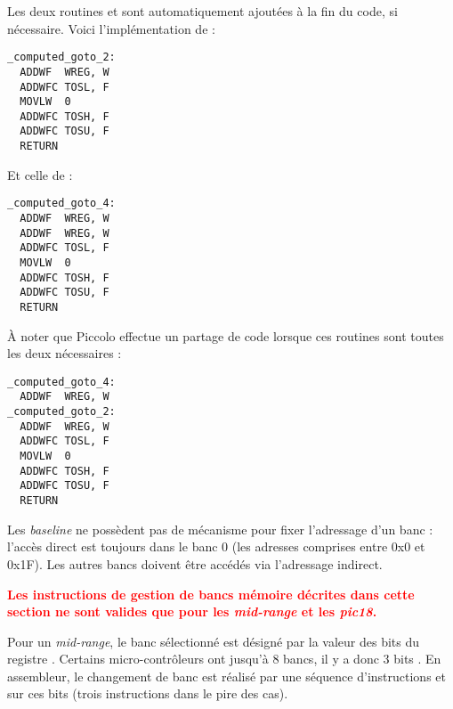 
Les deux routines  et  sont automatiquement ajoutées à la fin du code, si nécessaire. Voici l'implémentation de  :
\begin{lstlisting}[language=assembleur]
_computed_goto_2:
  ADDWF  WREG, W
  ADDWFC TOSL, F
  MOVLW  0
  ADDWFC TOSH, F
  ADDWFC TOSU, F
  RETURN
\end{lstlisting}

Et celle de  :
\begin{lstlisting}[language=assembleur]
_computed_goto_4:
  ADDWF  WREG, W
  ADDWF  WREG, W
  ADDWFC TOSL, F
  MOVLW  0
  ADDWFC TOSH, F
  ADDWFC TOSU, F
  RETURN
\end{lstlisting}

À noter que Piccolo effectue un partage de code lorsque ces routines sont toutes les deux nécessaires :
\begin{lstlisting}[language=assembleur]
_computed_goto_4:
  ADDWF  WREG, W
_computed_goto_2:
  ADDWF  WREG, W
  ADDWFC TOSL, F
  MOVLW  0
  ADDWFC TOSH, F
  ADDWFC TOSU, F
  RETURN
\end{lstlisting}













Les \emph{baseline} ne possèdent pas de mécanisme pour fixer l'adressage d'un banc : l'accès direct est toujours dans le banc 0 (les adresses comprises entre 0x0 et 0x1F). Les autres bancs doivent être accédés via l'adressage indirect.

\textcolor{red}{\bf Les instructions de gestion de bancs mémoire décrites dans cette section ne sont valides que pour les \emph{mid-range} et les \emph{pic18}.}

Pour un \emph{mid-range}, le banc sélectionné est désigné par la valeur des bits  du registre . Certains micro-contrôleurs ont jusqu'à 8 bancs, il y a donc 3 bits . En assembleur, le changement de banc est réalisé par une séquence d'instructions  et  sur ces bits (trois instructions dans le pire des cas). 


